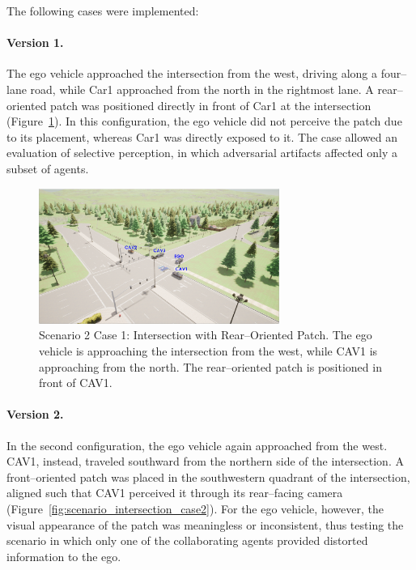 The following cases were implemented:

\paragraph{Version 1.}  
The ego vehicle approached the intersection from the west, driving along a four–lane road, while Car1 approached from the north in the rightmost lane.  
A rear–oriented patch was positioned directly in front of Car1 at the intersection (Figure~\ref{fig:scenario_intersection_case1}). In this configuration, the ego vehicle did not perceive the patch due to its placement, whereas Car1 was directly exposed to it. The case allowed an evaluation of selective perception, in which adversarial artifacts affected only a subset of agents.

\begin{figure}[H]
    \centering
    \includegraphics[width=0.7\textwidth]{figures/experiments/scenario2_v1.png}
    \caption{Scenario 2 Case 1: Intersection with Rear–Oriented Patch. The ego vehicle is approaching the intersection from the west, while CAV1 is approaching from the north. 
    The rear–oriented patch is positioned in front of CAV1.}
    \label{fig:scenario_intersection_case1}
\end{figure}

\paragraph{Version 2.}  
In the second configuration, the ego vehicle again approached from the west. CAV1, instead, traveled southward from the northern side of the intersection. A front–oriented patch was placed in the southwestern quadrant of the intersection, 
aligned such that CAV1 perceived it through its rear–facing camera (Figure~\ref{fig:scenario_intersection_case2}).
For the ego vehicle, however, the visual appearance of the patch was meaningless or inconsistent, thus testing the scenario in which only one of the collaborating agents provided distorted information to the ego.

